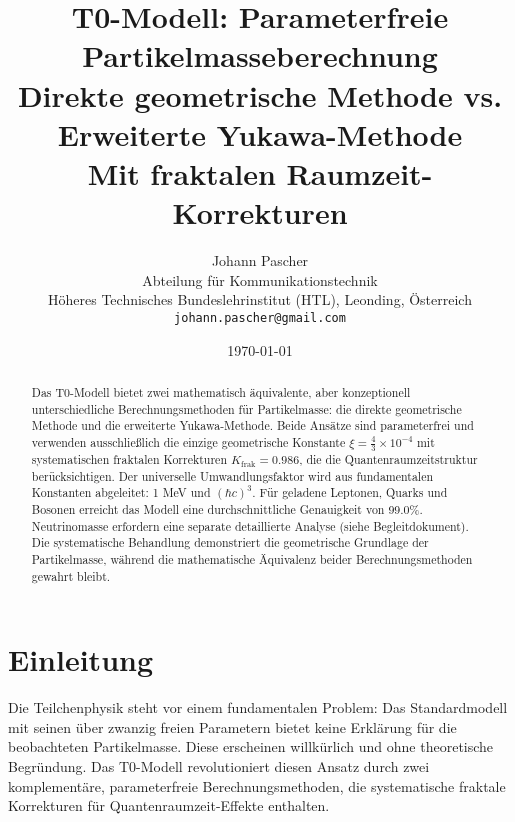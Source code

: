 \documentclass[12pt,a4paper]{article}
\newcommand{\xipar}{\xi}
\begin{document}
	
	\title{T0-Modell: Parameterfreie Partikelmasseberechnung \\
		\large Direkte geometrische Methode vs. Erweiterte Yukawa-Methode \\
		\large Mit fraktalen Raumzeit-Korrekturen}
	\author{Johann Pascher\\
		Abteilung f\"ur Kommunikationstechnik\\
		H\"o{}heres Technisches Bundeslehrinstitut (HTL), Leonding, \"O{}sterreich\\
		\texttt{johann.pascher@gmail.com}}
	\date{\today}
	
	\maketitle
	
	\begin{abstract}
		Das T0-Modell bietet zwei mathematisch \"a{}quivalente, aber konzeptionell unterschiedliche Berechnungsmethoden f\"ur Partikelmasse: die direkte geometrische Methode und die erweiterte Yukawa-Methode. Beide Ans\"a{}tze sind parameterfrei und verwenden ausschlie\ss{}lich die einzige geometrische Konstante $\xipar = \frac{4}{3} \times 10^{-4}$ mit systematischen fraktalen Korrekturen $K_{\text{frak}} = 0.986$, die die Quantenraumzeitstruktur ber\"u{}cksichtigen. Der universelle Umwandlungsfaktor wird aus fundamentalen Konstanten abgeleitet: 1 MeV und $(\hbar c)^3$. F\"ur geladene Leptonen, Quarks und Bosonen erreicht das Modell eine durchschnittliche Genauigkeit von 99.0\%. Neutrinomasse erfordern eine separate detaillierte Analyse (siehe Begleitdokument). Die systematische Behandlung demonstriert die geometrische Grundlage der Partikelmasse, w\"a{}hrend die mathematische \"A{}quivalenz beider Berechnungsmethoden gewahrt bleibt.
	\end{abstract}
	
	\tableofcontents
	\newpage
	
	\section{Einleitung}
	\label{sec:introduction}
	
	Die Teilchenphysik steht vor einem fundamentalen Problem: Das Standardmodell mit seinen \"u{}ber zwanzig freien Parametern bietet keine Erkl\"a{}rung f\"ur die beobachteten Partikelmasse. Diese erscheinen willk\"u{}rlich und ohne theoretische Begr\"u{}ndung. Das T0-Modell revolutioniert diesen Ansatz durch zwei komplement\"a{}re, parameterfreie Berechnungsmethoden, die systematische fraktale Korrekturen f\"ur Quantenraumzeit-Effekte enthalten.
	
\end{document}
